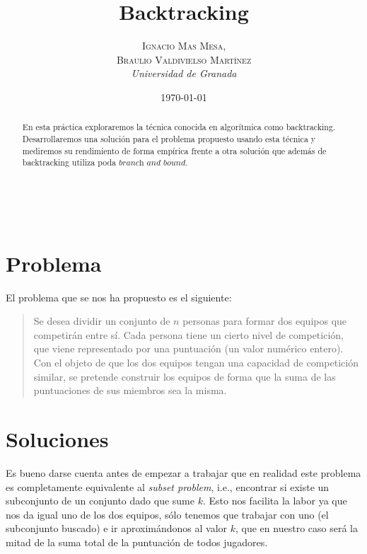 \documentclass[a4paper, 11pt]{article}
\title{\textbf{Backtracking}\\ %
} %
\author{\textsc{Ignacio Mas Mesa,\\Braulio Valdivielso Martínez} %
\\{\textit{Universidad de Granada}}} %
\date{\today} %
\makeatletter
\renewcommand{\maketitle}{
  \begin{flushright} %
  
  {\LARGE\@title} %
  
  \vspace{50pt} %
  
  {\large\@author} %
  \\\@date %
  \vspace{40pt} %
  \end{flushright}
}
\makeatother
\begin{document}
\maketitle %

\renewcommand{\abstractname}{Abstract} %
\begin{abstract}
En esta práctica exploraremos la técnica conocida en algorítmica como backtracking. Desarrollaremos una solución para el problema propuesto usando esta técnica y mediremos su rendimiento de forma empírica frente a otra solución que además de backtracking utiliza poda \(\textit{branch and bound}\).
\end{abstract}

\vspace{30pt} %


  \tableofcontents

\pagebreak


\section{Problema}
El problema que se nos ha propuesto es el siguiente:
\begin{quote}
Se desea dividir un conjunto de $n$ personas para formar dos equipos que competirán entre sí.
Cada persona tiene un cierto nivel de competición, que viene representado por una puntuación
(un valor numérico entero). Con el objeto de que los dos equipos tengan una capacidad de
competición similar, se pretende construir los equipos de forma que la suma de las puntuaciones
de sus miembros sea la misma. 
\end{quote}

\section{Soluciones}

Es bueno darse cuenta antes de empezar a trabajar que en realidad este problema
es completamente equivalente al \textit{subset problem}, i.e., encontrar si existe
un subconjunto de un conjunto dado que sume $k$. Esto nos facilita la labor ya
que nos da igual uno de los dos equipos, sólo tenemos que trabajar con uno (el subconjunto
buscado) e ir aproximándonos al valor $k$, que en nuestro caso será la mitad de la 
suma total de la puntuación de todos jugadores.
\end{document}
